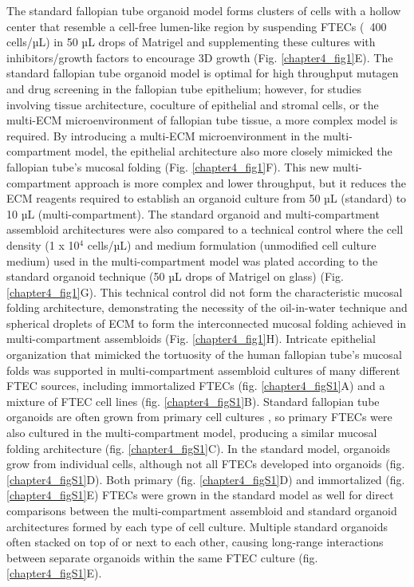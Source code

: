 \begin{refsection}
    The standard fallopian tube organoid model forms clusters of cells with a hollow center that resemble a cell-free lumen-like region\cite{kessler2015a,xie2018a} by suspending FTECs (~400 cells/µL) in 50 µL drops of Matrigel and supplementing these cultures with inhibitors/growth factors to encourage 3D growth (Fig. \ref{chapter4_fig1}E). The standard fallopian tube organoid model is optimal for high throughput mutagen and drug screening in the fallopian tube epithelium\cite{kessler2015a}; however, for studies involving tissue architecture, coculture of epithelial and stromal cells, or the multi-ECM microenvironment of fallopian tube tissue\cite{wheeler1982a,popescu2005a}, a more complex model is required. By introducing a multi-ECM microenvironment in the multi-compartment model, the epithelial architecture also more closely mimicked the fallopian tube’s mucosal folding (Fig. \ref{chapter4_fig1}F). This new multi-compartment approach is more complex and lower throughput, but it reduces the ECM reagents required to establish an organoid culture from 50 µL (standard) to 10 µL (multi-compartment). The standard organoid and multi-compartment assembloid architectures were also compared to a technical control where the cell density (1 x 10$^4$ cells/µL) and medium formulation (unmodified cell culture medium) used in the multi-compartment model was plated according to the standard organoid technique (50 µL drops of Matrigel on glass) (Fig. \ref{chapter4_fig1}G). This technical control did not form the characteristic mucosal folding architecture, demonstrating the necessity of the oil-in-water technique and spherical droplets of ECM to form the interconnected mucosal folding achieved in multi-compartment assembloids (Fig. \ref{chapter4_fig1}H).
    Intricate epithelial organization that mimicked the tortuosity of the human fallopian tube’s mucosal folds was supported in multi-compartment assembloid cultures of many different FTEC sources, including immortalized FTECs (fig. \ref{chapter4_figS1}A) and a mixture of FTEC cell lines (fig. \ref{chapter4_figS1}B). Standard fallopian tube organoids are often grown from primary cell cultures \cite{kessler2015a}, so primary FTECs were also cultured in the multi-compartment model, producing a similar mucosal folding architecture (fig. \ref{chapter4_figS1}C). In the standard model, organoids grow from individual cells\cite{kessler2015a}, although not all FTECs developed into organoids (fig. \ref{chapter4_figS1}D). Both primary (fig. \ref{chapter4_figS1}D) and immortalized (fig. \ref{chapter4_figS1}E) FTECs were grown in the standard model as well for direct comparisons between the multi-compartment assembloid and standard organoid architectures formed by each type of cell culture. Multiple standard organoids often stacked on top of or next to each other, causing long-range interactions between separate organoids within the same FTEC culture (fig. \ref{chapter4_figS1}E). 

\end{refsection}
